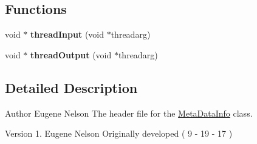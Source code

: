 \subsection*{Functions}
\begin{DoxyCompactItemize}
\item 
void $\ast$ {\bfseries thread\+Input} (void $\ast$threadarg)\hypertarget{_meta_data_info_8hh_a34d478987de22d6dae77627986271dd5}{}\label{_meta_data_info_8hh_a34d478987de22d6dae77627986271dd5}

\item 
void $\ast$ {\bfseries thread\+Output} (void $\ast$threadarg)\hypertarget{_meta_data_info_8hh_afaf2db8d6ba7020c9046f5f18dd083e7}{}\label{_meta_data_info_8hh_afaf2db8d6ba7020c9046f5f18dd083e7}

\end{DoxyCompactItemize}


\subsection{Detailed Description}
\begin{DoxyAuthor}{Author}
Eugene Nelson  The header file for the \hyperlink{class_meta_data_info}{Meta\+Data\+Info} class. 
\end{DoxyAuthor}
\begin{DoxyVersion}{Version}
1. Eugene Nelson Originally developed ( 9 -\/ 19 -\/ 17 ) 
\end{DoxyVersion}
